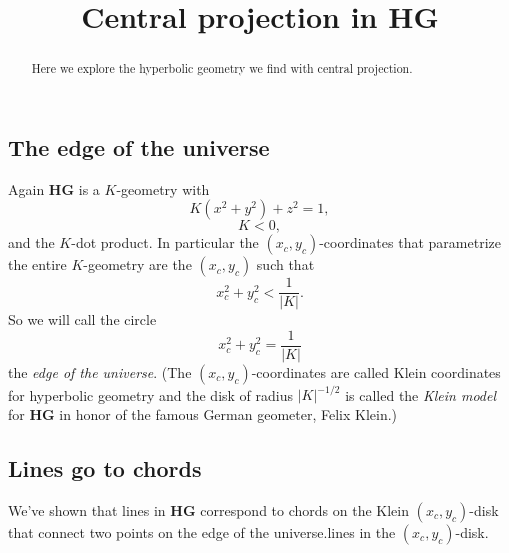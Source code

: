 \documentclass{ximera}
\title{Central projection in \textbf{HG}}
\begin{document}
\begin{abstract}
Here we explore the hyperbolic geometry we find with central projection. 
\end{abstract}
\maketitle


\subsection*{The edge of the universe}

Again \textbf{HG} is a $K$-geometry with
\begin{equation}
K\left(  x^{2}+y^{2}\right)  +z^{2}=1, \label{74}%
\end{equation}
\[
K<0,
\]
and the $K$-dot product. %
In particular %
the $\left( x_{c},y_{c}\right) $-coordinates that parametrize the
entire $K$-geometry are the $\left( x_{c},y_{c}\right) $ such that%
\[
x_{c}^{2}+y_{c}^{2}<\frac{1}{\left\vert K\right\vert }.
\]
So we will call the circle%
\[
x_{c}^{2}+y_{c}^{2}=\frac{1}{\left\vert K\right\vert }%
\]
the \textit{edge of the universe}. (The $\left(  x_{c},y_{c}\right)
$-coordinates are called Klein coordinates for hyperbolic geometry and the
disk of radius $\left\vert K\right\vert ^{-1/2}$ is called the \textit{Klein
model} for \textbf{HG} in honor of the famous German geometer, Felix
Klein.)

\subsection*{Lines go to chords}

We've shown that lines in \textbf{HG} correspond to chords on the
Klein $\left( x_{c},y_{c}\right) $-disk that connect two points on the
edge of the universe.lines in the $\left( x_{c},y_{c}\right) $-disk.
\end{document}
